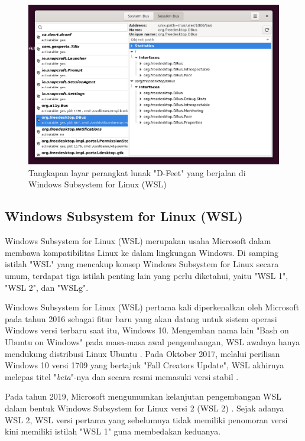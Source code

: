 \begin{figure}[h]
    \centering
    \includegraphics[width=0.75\linewidth]{assets/dfeet-window-screenshot.png}
    \caption{Tangkapan layar perangkat lunak "D-Feet" yang berjalan di Windows Subsystem for Linux (WSL)}
    \label{screenshot-of-dfeet}
\end{figure}

\subsection{Windows Subsystem for Linux (WSL)}

Windows Subsystem for Linux (WSL) merupakan usaha Microsoft dalam membawa kompatibilitas Linux ke dalam lingkungan Windows. Di samping istilah "WSL" yang mencakup konsep Windows Subsystem for Linux secara umum, terdapat tiga istilah penting lain yang perlu diketahui, yaitu "WSL 1", "WSL 2", dan "WSLg".

Windows Subsystem for Linux (WSL) pertama kali diperkenalkan oleh Microsoft pada tahun 2016 sebagai fitur baru yang akan datang untuk sistem operasi Windows versi terbaru saat itu, Windows 10. Mengemban nama lain "Bash on Ubuntu on Windows" pada masa-masa awal pengembangan, WSL awalnya hanya mendukung distribusi Linux Ubuntu \cite{bouow-release-article}. Pada Oktober 2017, melalui perilisan Windows 10 versi 1709 yang bertajuk "Fall Creators Update", WSL akhirnya melepas titel "\textit{beta}"-nya dan secara resmi memasuki versi stabil \cite{omgubuntu-wsl-exits-beta}.

Pada tahun 2019, Microsoft mengumumkan kelanjutan pengembangan WSL dalam bentuk Windows Subsystem for Linux versi 2 (WSL 2) \cite{polarsparc-introduction-to-wsl2}. Sejak adanya WSL 2, WSL versi pertama yang sebelumnya tidak memiliki penomoran versi kini memiliki istilah "WSL 1" guna membedakan keduanya.

